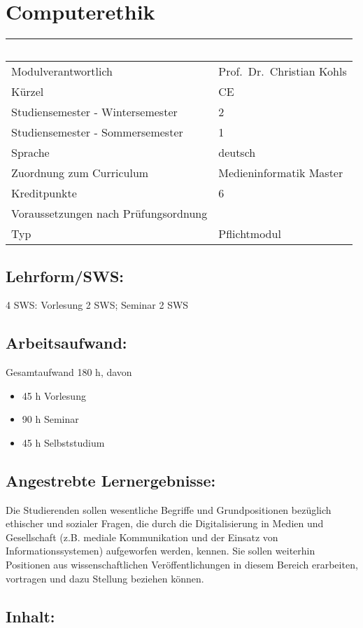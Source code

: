 \chapter{Computerethik}\label{computerethik}

\begin{longtable}[]{@{}ll@{}}
\toprule
~ & ~\tabularnewline
\midrule
\endhead
Modulverantwortlich & Prof.~Dr.~Christian Kohls\tabularnewline
Kürzel & CE\tabularnewline
Studiensemester - Wintersemester & 2\tabularnewline
Studiensemester - Sommersemester & 1\tabularnewline
Sprache & deutsch\tabularnewline
Zuordnung zum Curriculum & Medieninformatik Master\tabularnewline
Kreditpunkte & 6\tabularnewline
Voraussetzungen nach Prüfungsordnung &\tabularnewline
Typ & Pflichtmodul\tabularnewline
\bottomrule
\end{longtable}

\section*{Lehrform/SWS:}\label{lehrformsws}

4 SWS: Vorlesung 2 SWS; Seminar 2 SWS

\section*{Arbeitsaufwand:}\label{arbeitsaufwand}

Gesamtaufwand 180 h, davon

\begin{itemize}
\item
  45 h Vorlesung
\item
  90 h Seminar
\item
  45 h Selbststudium
\end{itemize}

\section*{Angestrebte
Lernergebnisse:}\label{angestrebte-lernergebnisse}

Die Studierenden sollen wesentliche Begriffe und Grundpositionen
bezüglich ethischer und sozialer Fragen, die durch die Digitalisierung
in Medien und Gesellschaft (z.B. mediale Kommunikation und der Einsatz
von Informationssystemen) aufgeworfen werden, kennen. Sie sollen
weiterhin Positionen aus wissenschaftlichen Veröffentlichungen in diesem
Bereich erarbeiten, vortragen und dazu Stellung beziehen können.

\section*{Inhalt:}\label{inhalt}


